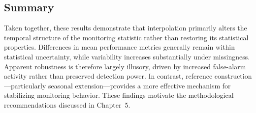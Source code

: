\begin{table}[htbp]
\centering
\caption{\ac{ARL}$_0$ performance with standard deviation under 50\% missingness.}
\label{tab:arl0_50pct_ext}
\end{table}


\subsection{Summary}

Taken together, these results demonstrate that interpolation primarily alters the temporal structure of the monitoring statistic rather than restoring its statistical properties. Differences in mean performance metrics generally remain within statistical uncertainty, while variability increases substantially under missingness. Apparent robustness is therefore largely illusory, driven by increased false-alarm activity rather than preserved detection power. In contrast, reference construction—particularly seasonal extension—provides a more effective mechanism for stabilizing monitoring behavior. These findings motivate the methodological recommendations discussed in Chapter~5.
